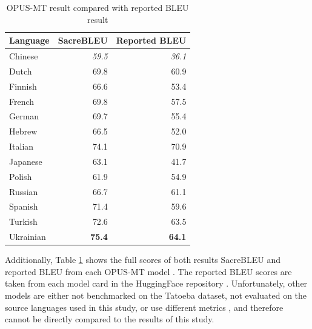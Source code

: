 \documentclass[a4paper, 11pt]{article}
\begin{document}
\begin{table}[htbp]
    \centering
    \begin{tabular}{l r r}
        \hline
        \textbf{Language} & \textbf{SacreBLEU} & \textbf{Reported BLEU} \\
        \hline
        Chinese           & \textit{59.5}      & \textit{36.1}          \\
        Dutch             & 69.8               & 60.9                   \\
        Finnish           & 66.6               & 53.4                   \\
        French            & 69.8               & 57.5                   \\
        German            & 69.7               & 55.4                   \\
        Hebrew            & 66.5               & 52.0                   \\
        Italian           & 74.1               & 70.9                   \\
        Japanese          & 63.1               & 41.7                   \\
        Polish            & 61.9               & 54.9                   \\
        Russian           & 66.7               & 61.1                   \\
        Spanish           & 71.4               & 59.6                   \\
        Turkish           & 72.6               & 63.5                   \\
        Ukrainian         & \textbf{75.4}      & \textbf{64.1}          \\
        \hline
    \end{tabular}
    \caption{OPUS-MT result compared with reported BLEU result}
    \label{table:opus_comparison}
\end{table}

Additionally, Table \ref{table:opus_comparison} shows the full scores of both results SacreBLEU and reported BLEU from each OPUS-MT model \cite{tiedemann-2020-opus-mt}. The reported BLEU scores are taken from each model card in the HuggingFace repository \cite{huggingface}. Unfortunately, other models are either not benchmarked on the Tatoeba dataset, not evaluated on the source languages used in this study, or use different metrics \cite{liu-2020-mbart,fan-2020-m2m100,nllb200-2020}, and therefore cannot be directly compared to the results of this study.
\end{document}
